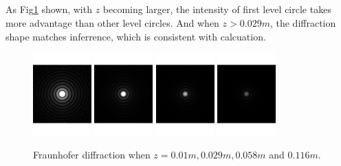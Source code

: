 \documentclass[fontsize=11pt]{scrartcl}
\begin{document}
\subsection{}
As Fig\ref{fig1.1} shown, with $z$ becoming larger, the intensity of first level circle 
takes more advantage than other level circles. And when $z > 0.029m$, the diffraction shape
matches inferrence, which is consistent with calcuation. 
\begin{figure}[H]
    \centering
     \includegraphics[width=0.20\textwidth]{img/1_Fra_0.01.bmp.pdf}
     \includegraphics[width=0.20\textwidth]{img/1_Fra_0.029.bmp.pdf}
     \includegraphics[width=0.20\textwidth]{img/1_Fra_0.058.bmp.pdf}
     \includegraphics[width=0.20\textwidth]{img/1_Fra_0.116.bmp.pdf}
     \caption{Fraunhofer diffraction when $z = 0.01m, 0.029m, 0.058m$ and $0.116m$.}
     \label{fig1.1}
\end{figure}
\end{document}
